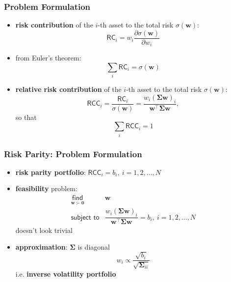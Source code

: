 \documentclass[aspectratio=169]{beamer}
\begin{document}
        \begin{frame}
          \frametitle{Problem Formulation}
          \vspace{.75cm}
          \begin{itemize}
            \item \textbf{risk contribution} of the $i$-th asset to the total risk $\sigma(\bm{w})$:
              \begin{equation*}
                \textsf{RC}_{i} = w_i \dfrac{\partial \sigma(\bm{w})}{\partial w_i}
              \end{equation*}
            \item from Euler's theorem:
              \begin{equation*}
                \sum_{i}\textsf{RC}_i = \sigma(\bm{w})
              \end{equation*}
            \item \textbf{relative risk contribution} of the $i$-th asset to the total risk $\sigma(\bm{w})$:
              \begin{equation*}
                \textsf{RCC}_i = \dfrac{\textsf{RC}_i}{\sigma(\bm{w})} = \dfrac{w_i\left(\boldsymbol{\Sigma\bm{w}}\right)_i}{\bm{w}^\top\boldsymbol{\Sigma}\bm{w}},
              \end{equation*}
              so that
              \begin{equation*}
                \sum_{i}\textsf{RCC}_i = 1
              \end{equation*}
          \end{itemize}
        \end{frame}

        \begin{frame}
          \frametitle{Risk Parity: Problem Formulation}
          \vspace{.5cm}
            \begin{itemize}
              \item \textbf{risk parity portfolio}: $\textsf{RCC}_i = b_i,~i=1,2,\dots,N$
              \item \textbf{feasibility} problem:
            \begin{equation*}
            \begin{array}{ll}
              \underset{\bm{w} \succ \mathbf{0}}{\textsf{find}} & \bm{w} \\
              \textsf{subject to} &
              \dfrac{w_i\left(\boldsymbol{\Sigma\bm{w}}\right)_i}{\bm{w}^\top\boldsymbol{\Sigma}\bm{w}} =
              b_i,~ i = 1, 2, \dots, N
            \end{array}
            \end{equation*}
            doesn't look trivial
          \item \textbf{approximation}: $\boldsymbol{\Sigma}$ is diagonal
            \begin{equation*}
              w_i \propto \dfrac{\sqrt{b_i}}{\sqrt{\boldsymbol{\Sigma}_{ii}}}
            \end{equation*}
          i.e. \textbf{inverse volatility portfolio}
            \end{itemize}
        \end{frame}
\end{document}
